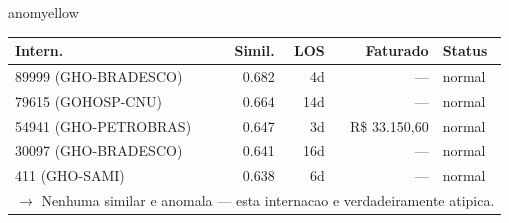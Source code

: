 \documentclass[a4paper,10pt]{article}
\begin{document}
\begin{anomalycard}[Internacao 168062 | GHO-PETROBRAS | MODERADO (z=2.33)]{anomyellow}
\begin{tabular}{l r r r l}\toprule\textbf{Intern.} & \textbf{Simil.} & \textbf{LOS} & \textbf{Faturado} & \textbf{Status} \\\midrule
89999 (GHO-BRADESCO) & 0.682 & 4d & --- & \textcolor{jcubeblue}{normal} \\
79615 (GOHOSP-CNU) & 0.664 & 14d & --- & \textcolor{jcubeblue}{normal} \\
54941 (GHO-PETROBRAS) & 0.647 & 3d & R\$ 33.150,60 & \textcolor{jcubeblue}{normal} \\
30097 (GHO-BRADESCO) & 0.641 & 16d & --- & \textcolor{jcubeblue}{normal} \\
411 (GHO-SAMI) & 0.638 & 6d & --- & \textcolor{jcubeblue}{normal} \\
\multicolumn{5}{l}{\textcolor{jcubeblue}{\small $\rightarrow$ Nenhuma similar e anomala --- esta internacao e verdadeiramente atipica.}} \\
\bottomrule\end{tabular}


\end{anomalycard}

\newpage
\end{document}
